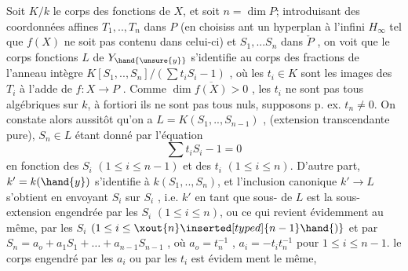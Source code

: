 
 Soit $K/k$ le corps des fonctions de $X$, et soit $n=\dim P$;
introduisant des coordonnées  affines $T_1,..,T_n$ dans $P$ (en choisiss
ant un hyperplan à l'infini $H_\infty$ tel que $f(X)$ ne soit pas contenu dans
celui-ci) et $S_1,...S_n$ dans $\check{P}$ , on voit que le corps fonctions $L$
de $Y_{\hand{\unsure{y}}}$  s'identifie au corps des fractions de l'anneau intègre
$K[S_1,..,S_n]/(\sum t_iS_i - 1)$ , où les $t_i \in K$ sont les images des $T_i$ à
l'adde de $f:X\to P$ . Comme $\dim \overline{f(X)} > 0$ , les $t_i$ ne sont pas tous
algébriques sur $k$, à fortiori ils ne sont pas tous nuls, supposons
p. ex. $t_n \neq 0$. On constate alors aussitôt qu'on a $L = K(S_1,..,S_{n-1})$ ,
(extension transcendante pure), $S_n\in L$ étant donné par l'équation
\[ \sum t_iS_i - 1 = 0 \]
en fonction des $S_i$ $(1\leq i\leq n-1)$ et des $t_i$ $(1\leq i\leq n)$. D'autre part,
$k' = k(\hand{y})$ s'identifie à $k(S_1,..,S_n)$, et l'inclusion canonique
$k'\longrightarrow L$ s'obtient en envoyant $S_i$ sur $S_i$ , i.e. $k'$ en tant que sous-%
 de $L$ est la sous-extension engendrée par les $S_i$ $(1\leq i\leq n)$, ou
ce qui revient évidemment au même, par les $S_i$ $(1\leq i\leq \xout{n}\inserted[typed]{n-1}\hand{)}$ et par
$S_n = a_o + a_1S_1 + \ldots + a_{n-1}S_{n-1}$ , où $a_o = t_n^{-1}$ , $a_i =-t_it_n^{-1}$ pour
$1\leq i\leq n-1$.  le corps engendré par les $a_i$ ou par les $t_i$ est évidem
ment le même, 

